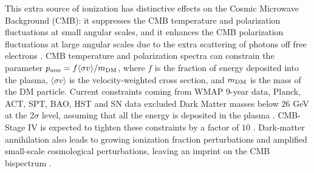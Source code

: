 This extra source of ionization has distinctive effects on the Cosmic Microwave Background (CMB): it suppresses the CMB temperature and polarization fluctuations at small angular scales, and it enhances the CMB polarization fluctuations at large angular scales due to the extra scattering of photons off free electrons \cite{Chen:2003gz,Padmanabhan:2005es}.
CMB temperature and polarization spectra can constrain the parameter
$p_{\rm ann}=f\langle\sigma v\rangle/m_{\rm DM}$, where $f$ is the fraction of energy
deposited into the plasma, $\langle\sigma v\rangle$ is the velocity-weighted
cross section, and $m_{\rm DM}$ is the mass of the DM particle.
Current constraints coming from WMAP 9-year data,
Planck, ACT, SPT, BAO, HST and SN data excluded
Dark Matter masses below $26$ GeV at the 2$\sigma$ level, assuming that
all the energy is deposited in the plasma \cite{Madhavacheril:2013cna}. CMB-Stage IV is expected to tighten these constraints by a factor of $10$ \cite{Wu:2014hta}. Dark-matter annihilation also leads to growing ionization fraction perturbations and amplified small-scale cosmological perturbations, leaving an imprint on the CMB bispectrum \cite{Dvorkin:2013cga}.

%
